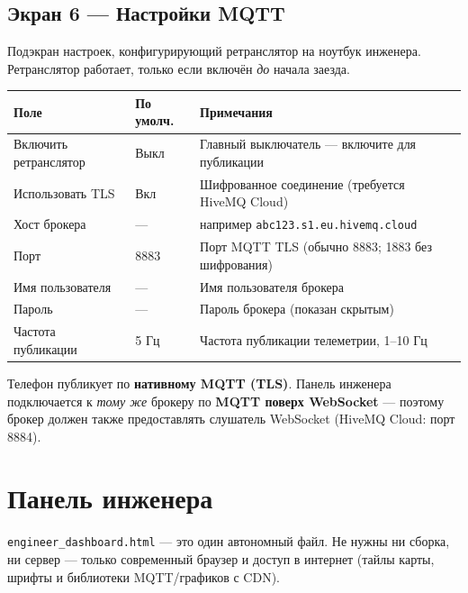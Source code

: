 \documentclass[11pt,a4paper,oneside]{report}
\newcommand{\code}[1]{\texttt{#1}}
\begin{document}
\subsection{Экран 6 --- Настройки MQTT}
Подэкран настроек, конфигурирующий ретранслятор на ноутбук инженера. Ретранслятор
работает, только если включён \emph{до} начала заезда.

\begin{tabularx}{\linewidth}{@{}llL@{}}
\toprule
\textbf{Поле} & \textbf{По умолч.} & \textbf{Примечания}\\
\midrule
Включить ретранслятор & Выкл & Главный выключатель --- включите для публикации\\
Использовать TLS & Вкл & Шифрованное соединение (требуется HiveMQ Cloud)\\
Хост брокера & --- & например \code{abc123.s1.eu.hivemq.cloud}\\
Порт & 8883 & Порт MQTT TLS (обычно 8883; 1883 без шифрования)\\
Имя пользователя & --- & Имя пользователя брокера\\
Пароль & --- & Пароль брокера (показан скрытым)\\
Частота публикации & 5 Гц & Частота публикации телеметрии, 1--10 Гц\\
\bottomrule
\end{tabularx}
\begin{tgnote}
Телефон публикует по \textbf{нативному MQTT (TLS)}. Панель инженера подключается к
\emph{тому же} брокеру по \textbf{MQTT поверх WebSocket} --- поэтому брокер должен
также предоставлять слушатель WebSocket (HiveMQ Cloud: порт 8884).
\end{tgnote}

\section{Панель инженера}
\code{engineer\_dashboard.html} --- это один автономный файл. Не нужны ни сборка, ни
сервер --- только современный браузер и доступ в интернет (тайлы карты, шрифты и
библиотеки MQTT/графиков с CDN).
\end{document}
